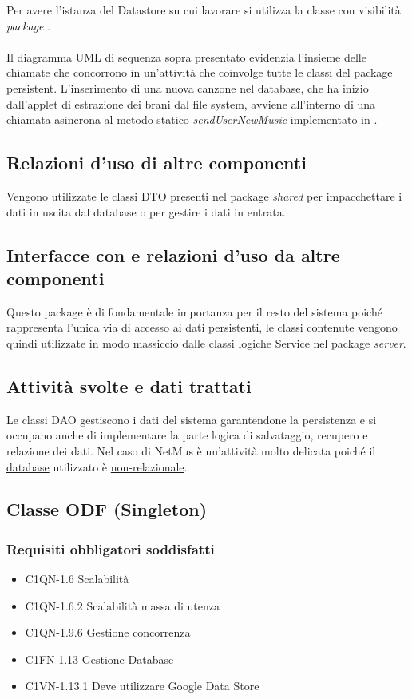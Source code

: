 Per avere l'istanza del Datastore su cui lavorare si
utilizza la classe con visibilit\`a \emph{package} . \\\\
Il diagramma UML di sequenza sopra presentato evidenzia l'insieme delle chiamate
che concorrono in un'attivit\`a che coinvolge tutte le classi del package
persistent. L'inserimento di una nuova canzone nel database, che ha inizio
dall'applet di estrazione dei brani dal file system, avviene all'interno di una
chiamata asincrona al metodo statico \emph{sendUserNewMusic} implementato in
.
\subsection*{Relazioni d'uso di altre componenti} Vengono utilizzate le classi
DTO presenti nel package \emph{shared} per impacchettare i dati in uscita dal
database o per gestire i dati in entrata. 
\subsection*{Interfacce con e relazioni d'uso da altre
componenti} Questo package \`e di fondamentale importanza per il resto del sistema poich\'e rappresenta l'unica via di accesso ai dati persistenti, le classi contenute vengono quindi utilizzate in modo massiccio dalle classi logiche Service nel package \emph{server}.
\subsection*{Attivit\`a svolte e dati trattati}
Le classi DAO gestiscono i dati del sistema garantendone la persistenza e si
occupano anche di implementare la parte logica di salvataggio, recupero e
relazione dei dati. Nel caso di NetMus \`e un'attivit\`a molto delicata poich\'e il
\underline{database} utilizzato \`e \underline{non-relazionale}.

\subsection{Classe ODF (Singleton)}
\subsubsection*{Requisiti obbligatori soddisfatti}
\begin{itemize}
    \item C1QN-1.6 Scalabilit\`a
    \item C1QN-1.6.2 Scalabilit\`a massa di utenza
    \item C1QN-1.9.6 Gestione concorrenza
    \item C1FN-1.13 Gestione Database
    \item C1VN-1.13.1 Deve utilizzare Google Data Store
\end{itemize}
